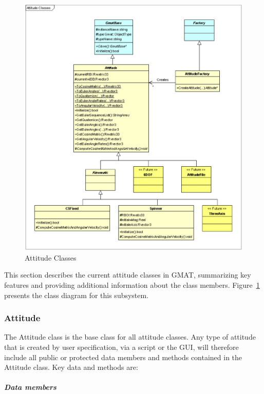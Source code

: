 \begin{figure}
\begin{center}
\includegraphics[scale=0.5]{Images/AttitudeClasses.eps}
\caption{\label{figure:AttitudeClasses}Attitude Classes}
\end{center}
\end{figure}

This section describes the current attitude classes in GMAT, summarizing key features and providing additional information about the class members.  Figure~\ref{figure:AttitudeClasses} presents the class diagram for this subsystem.

\subsubsection{Attitude}

The Attitude class is the base class for all attitude classes.  Any type of attitude that is created by user specification, via a script or the GUI, will therefore include all public or protected data members and methods contained in the Attitude class.  Key data and methods are:

\subparagraph{\textit{Data members}}

